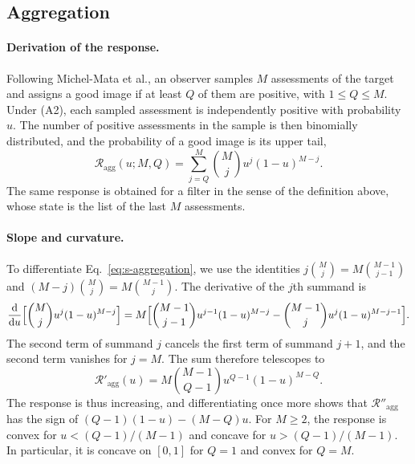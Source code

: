 \documentclass[10pt]{wlscirep}
\newcommand{\Rmap}{\mathscr{R}}            %
\newcommand{\dd}{\mathrm{d}}
\theoremstyle{plain}
\theoremstyle{remark}
\begin{document}
\subsection{Aggregation}

\paragraph{Derivation of the response.} Following Michel-Mata et al., an observer samples $M$ assessments of the target and assigns a good image if at least $Q$ of them are positive, with $1\leq Q\leq M$. Under (A2), each sampled assessment is independently positive with probability $u$. The number of positive assessments in the sample is then binomially distributed, and the probability of a good image is its upper tail,
\begin{equation}
\Rmap_{\mathrm{agg}}(u;M,Q)=\sum_{j=Q}^{M}\binom{M}{j}u^j(1-u)^{M-j}.
\label{eq:s-aggregation}
\end{equation}
The same response is obtained for a filter in the sense of the definition above, whose state is the list of the last $M$ assessments.

\paragraph{Slope and curvature.} To differentiate Eq.~\eqref{eq:s-aggregation}, we use the identities $j\binom{M}{j}=M\binom{M-1}{j-1}$ and $(M-j)\binom{M}{j}=M\binom{M-1}{j}$. The derivative of the $j$th summand is
\begin{equation}
\frac{\dd}{\dd u}\Bigl[\binom{M}{j}u^j(1-u)^{M-j}\Bigr]
=M\Bigl[\binom{M-1}{j-1}u^{j-1}(1-u)^{M-j}-\binom{M-1}{j}u^{j}(1-u)^{M-j-1}\Bigr].
\label{eq:s-agg-term}
\end{equation}
The second term of summand $j$ cancels the first term of summand $j+1$, and the second term vanishes for $j=M$. The sum therefore telescopes to
\begin{equation}
\Rmap'_{\mathrm{agg}}(u)=M\binom{M-1}{Q-1}u^{Q-1}(1-u)^{M-Q}.
\label{eq:s-agg-derivative}
\end{equation}
The response is thus increasing, and differentiating once more shows that $\Rmap''_{\mathrm{agg}}$ has the sign of $(Q-1)(1-u)-(M-Q)u$. For $M\geq2$, the response is convex for $u<(Q-1)/(M-1)$ and concave for $u>(Q-1)/(M-1)$. In particular, it is concave on $[0,1]$ for $Q=1$ and convex for $Q=M$.
\end{document}
